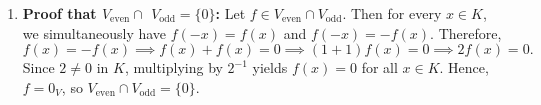 \begin{exercisesolution}
\begin{enumerate}[label=\textbf{(\alph*)}]
    \item \textbf{Proof that $V_{\mathrm{even}} \cap $ $V_{\mathrm{odd}} = \{0\}$:}
    Let $f \in V_{\mathrm{even}} \cap V_{\mathrm{odd}}$. Then for every $x \in K$, we simultaneously have $f(-x) = f(x)$ and $f(-x) = -f(x)$. Therefore,
    \[
    f(x) = -f(x) \implies f(x) + f(x) = 0 \implies (1 + 1) f(x) = 0 \implies 2 f(x) = 0.
    \]
    Since $2 \ne 0$ in $K$, multiplying by $2^{-1}$ yields $f(x) = 0$ for all $x \in K$. Hence, $f = 0_V$, so $V_{\mathrm{even}} \cap V_{\mathrm{odd}} = \{0\}$.
\end{enumerate}
\end{exercisesolution}

